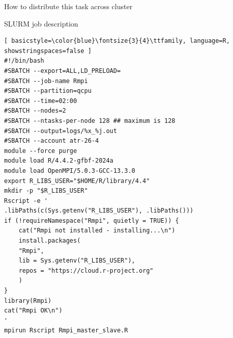 \documentclass[compress,xcolor=table]{beamer}
\begin{document}
	
	\begin{frame}[fragile]{How to distribute this task across cluster}
\hfill \href{https://github.com/janezpovh/parallel-R-nov-26/blob/main/code/Job_Rmpi_direct.sbatch} {
	} 
\vspace{-1mm} \begin{block} 
	{SLURM job description} 
\begin{lstlisting}[ basicstyle=\color{blue}\fontsize{3}{4}\ttfamily, language=R, showstringspaces=false ] 
#!/bin/bash
#SBATCH --export=ALL,LD_PRELOAD=
#SBATCH --job-name Rmpi
#SBATCH --partition=qcpu
#SBATCH --time=02:00
#SBATCH --nodes=2
#SBATCH --ntasks-per-node 128 ## maximum is 128
#SBATCH --output=logs/%x_%j.out
#SBATCH --account atr-26-4
module --force purge
module load R/4.4.2-gfbf-2024a
module load OpenMPI/5.0.3-GCC-13.3.0
export R_LIBS_USER="$HOME/R/library/4.4"
mkdir -p "$R_LIBS_USER"
Rscript -e '
.libPaths(c(Sys.getenv("R_LIBS_USER"), .libPaths()))
if (!requireNamespace("Rmpi", quietly = TRUE)) {
	cat("Rmpi not installed - installing...\n")
	install.packages(
	"Rmpi",
	lib = Sys.getenv("R_LIBS_USER"),
	repos = "https://cloud.r-project.org"
	)
}
library(Rmpi)
cat("Rmpi OK\n")
'
mpirun Rscript Rmpi_master_slave.R
\end{lstlisting}
		\end{block}
	\end{frame}
\end{document}

